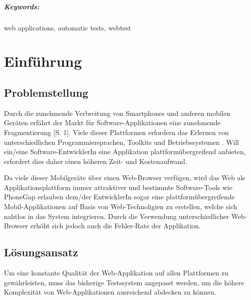 \documentclass[a4paper,bibtotoc,oneside]{scrbook}
\begin{document}
\vfill
\paragraph*{Keywords:} web applications, automatic tests, webtest
\newpage


\tableofcontents\thispagestyle{empty}
\newpage

\setcounter{page}{1}

\chapter{Einführung}


\section{Problemstellung}
Durch die zunehmende Verbreitung von Smartphones und anderen mobilen Geräten erfährt der Markt für Software-Applikationen eine zunehmende Fragmentierung \cite{smartphone}[S. 1]. Viele dieser Plattformen erfordern das Erlernen von unterschiedlichen Programmiersprachen, Toolkits und Betriebssystemen \cite{android}\cite{ios}. Will ein/eine Software-EntwicklerIn eine Applikation plattformübergreifend anbieten, erfordert dies daher einen höheren Zeit- und Kostenaufwand.

Da viele dieser Mobilgeräte über einen Web-Browser verfügen, wird das Web als Applikationsplattform immer attraktiver und bestimmte Software-Tools wie PhoneGap \cite{phonegap} erlauben dem/der EntwicklerIn sogar eine plattformübergreifende Mobil-Applikationen auf Basis von Web-Technoligien zu erstellen, welche sich nahtlos in das System integrieren. Durch die Verwendung unterschiedlicher Web-Browser erhöht sich jedoch auch die Fehler-Rate der Applikation. 

\section{Lösungsansatz}
Um eine konstante Qualität der Web-Applikation auf allen Plattformen zu gewährleisten, muss das bisherige Testssystem angepasst werden, um die höhere Komplexität von Web-Applikationen ausreichend abdecken zu können. 
\end{document}
